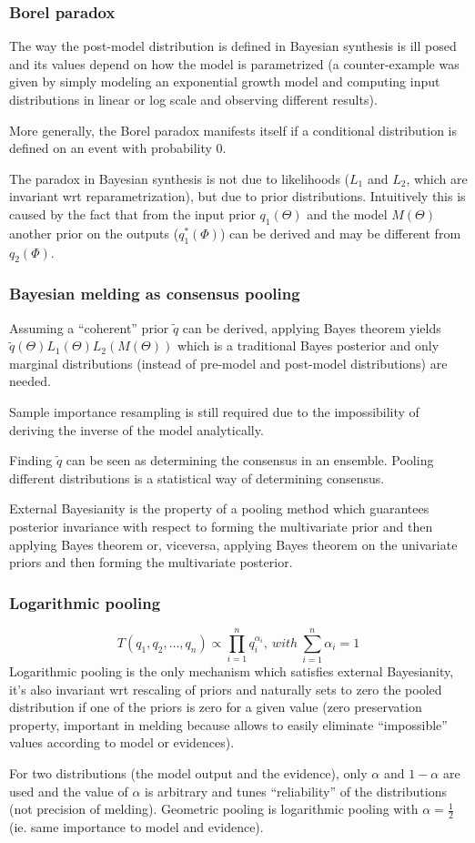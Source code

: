 \documentclass[aspectratio=43]{beamer}
\begin{document}
\begin{frame}
	\frametitle{Borel paradox}
	The way the post-model distribution is defined in Bayesian synthesis is ill posed and its values depend on how the model is parametrized (a counter-example was given by simply modeling an exponential growth model and computing input distributions in linear or log scale and observing different results).
	
	More generally, the Borel paradox manifests itself if a conditional distribution is defined on an event with probability 0.
	
	The paradox in Bayesian synthesis is not due to likelihoods ($L_1$ and $L_2$, which are invariant wrt reparametrization), but due to prior distributions. Intuitively this is caused by the fact that from the input prior $q_1(\Theta)$ and the model $M(\Theta)$ another prior on the outputs ($q_1^*(\Phi)$) can be derived and may be different from $q_2(\Phi)$.
\end{frame}

\begin{frame}
	\frametitle{Bayesian melding as consensus pooling}
	Assuming a ``coherent'' prior $\tilde{q}$ can be derived, applying Bayes theorem yields $\tilde{q}(\Theta)L_1(\Theta)L_2(M(\Theta))$ which is a traditional Bayes posterior and only marginal distributions (instead of pre-model and post-model distributions) are needed.
	
	Sample importance resampling is still required due to the impossibility of deriving the inverse of the model analytically.
	
	Finding $\tilde{q}$ can be seen as determining the consensus in an ensemble. Pooling different distributions is a statistical way of determining consensus.
	
	External Bayesianity is the property of a pooling method which guarantees posterior invariance with respect to forming the multivariate prior and then applying Bayes theorem or, viceversa, applying Bayes theorem on the univariate priors and then forming the multivariate posterior.
\end{frame}

\begin{frame}
	\frametitle{Logarithmic pooling}
	\begin{equation*}
		T(q_1, q_2, \dots, q_n) \propto \displaystyle\prod_{i=1}^n q_i^{\alpha_i},\ with\ \displaystyle\sum_{i=1}^n \alpha_i = 1
	\end{equation*}
	Logarithmic pooling is the only mechanism which satisfies external Bayesianity, it's also invariant wrt rescaling of priors and naturally sets to zero the pooled distribution if one of the priors is zero for a given value (zero preservation property, important in melding because allows to easily eliminate ``impossible'' values according to model or evidences).
	
	For two distributions (the model output and the evidence), only $\alpha$ and $1 - \alpha$ are used and the value of $\alpha$ is arbitrary and tunes ``reliability'' of the distributions (not precision of melding). Geometric pooling is logarithmic pooling with $\alpha = \frac{1}{2}$ (ie. same importance to model and evidence).
\end{frame}
\end{document}
